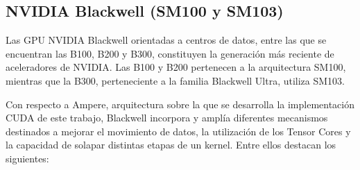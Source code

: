 \subsection{NVIDIA Blackwell (SM100 y SM103)}

Las GPU NVIDIA Blackwell orientadas a centros de datos, entre las que se encuentran las B100, B200 y B300, constituyen la generación más reciente de aceleradores de NVIDIA. Las B100 y B200 pertenecen a la arquitectura SM100, mientras que la B300, perteneciente a la familia Blackwell Ultra, utiliza SM103.

Con respecto a Ampere, arquitectura sobre la que se desarrolla la implementación CUDA de este trabajo, Blackwell incorpora y amplía diferentes mecanismos destinados a mejorar el movimiento de datos, la utilización de los Tensor Cores y la capacidad de solapar distintas etapas de un kernel. Entre ellos destacan los siguientes:

